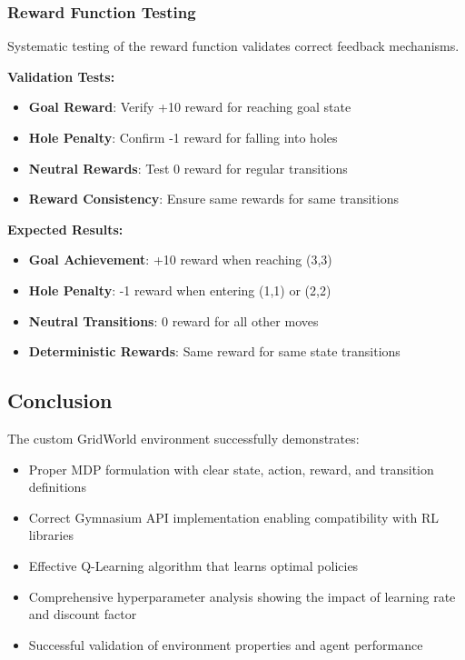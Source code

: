 \documentclass[12pt]{article}
\begin{document}
{{{\subsubsection{Reward Function Testing}

Systematic testing of the reward function validates correct feedback mechanisms.

\textbf{Validation Tests:}
\begin{itemize}
    \item \textbf{Goal Reward}: Verify +10 reward for reaching goal state
    \item \textbf{Hole Penalty}: Confirm -1 reward for falling into holes
    \item \textbf{Neutral Rewards}: Test 0 reward for regular transitions
    \item \textbf{Reward Consistency}: Ensure same rewards for same transitions
\end{itemize}

\textbf{Expected Results:}
\begin{itemize}
    \item \textbf{Goal Achievement}: +10 reward when reaching (3,3)
    \item \textbf{Hole Penalty}: -1 reward when entering (1,1) or (2,2)
    \item \textbf{Neutral Transitions}: 0 reward for all other moves
    \item \textbf{Deterministic Rewards}: Same reward for same state transitions
\end{itemize}

\subsection{Conclusion}

The custom GridWorld environment successfully demonstrates:

\begin{itemize}
    \item Proper MDP formulation with clear state, action, reward, and transition definitions
    \item Correct Gymnasium API implementation enabling compatibility with RL libraries
    \item Effective Q-Learning algorithm that learns optimal policies
    \item Comprehensive hyperparameter analysis showing the impact of learning rate and discount factor
    \item Successful validation of environment properties and agent performance
\end{itemize}

}}}
\end{document}

